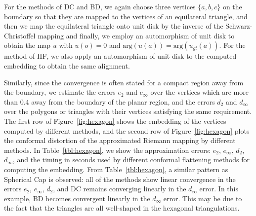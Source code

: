 \documentclass[11pt]{article}
\begin{document}
For the methods of DC and BD, we again choose three vertices $\{a, b, c\}$ 
on the boundary so that they are mapped to the vertices of an equilateral triangle, and then
we map the equilateral triangle onto unit disk by the inverse of the Schwarz-Christoffel mapping
and finally, we employ an automorphism of unit disk to obtain the map $u$ with $u(o) = 0$ and 
$\text{arg}(u(a)) = \text{arg}(u_{gt}(a))$. For the method of HF, we also apply an automorphism 
of unit disk to the computed embedding to obtain the same alignment.

Similarly, since the convergence is often stated for a compact region away from the boundary,
we estimate the errors $e_2$ and $e_\infty$ over the vertices which are more than $0.4$ away 
from the boundary of the planar region, and the errors $d_2$ and $d_\infty$ over the polygons 
or triangles with their vertices satisfying the same requirement. The first row of Figure~\ref{fig:hexagon} 
shows the embedding of the vertices computed by different methods, and the second row of Figure~\ref{fig:hexagon} 
plots the conformal distortion of the approximated Riemann mapping by different methods.
In Table~\ref{tbl:hexagon}, we show the approximation errors: $e_2$, $e_\infty$, $d_2$, $d_\infty$, and 
the timing in seconds used by different conformal flattening methods for computing the embedding. 
From Table~\ref{tbl:hexagon}, a similar pattern as Spherical Cap is observed: 
all of the methods show linear convergence in the errors $e_2$, $e_\infty$, $d_2$, and 
DC remains converging linearly in the $d_\infty$ error. In this example, BD becomes convergent linearly
in the $d_\infty$ error. This may be due to the fact that the triangles are all well-shaped in the 
hexagonal triangulations. 
\end{document}
